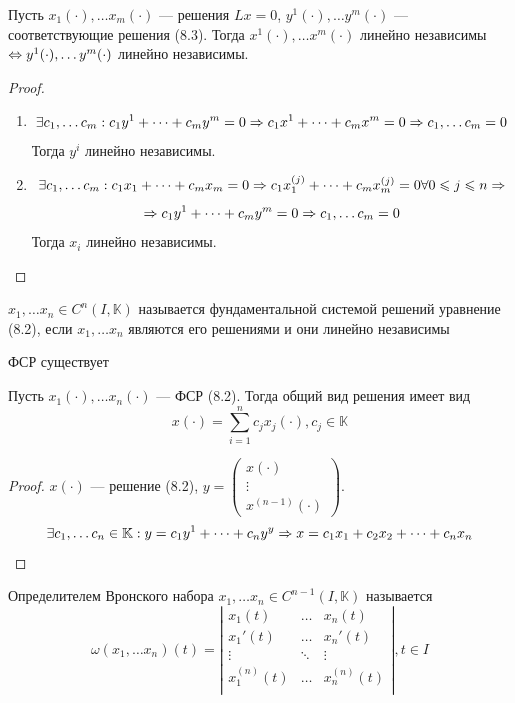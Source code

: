 \begin{lemma}
    Пусть \(x_1(\cdot), \dots x_m(\cdot)\) --- решения \(Lx = 0\), \(y^1(\cdot), \dots y^m(\cdot)\) --- соответствующие решения (8.3). Тогда \(x^1(\cdot), \dots x^m(\cdot)\) линейно независимы \(\Leftrightarrow y^1(\cdot), \dots y^m(\cdot)\) линейно независимы.
\end{lemma}
\begin{proof}\indent
    \begin{enumerate}
        \item[\(\Ra\)]
        \[\exists c_1, \dots c_m: c_1y^1 + \dots + c_my^m = 0 \Rightarrow c_1x^1 + \dots + c_mx^m = 0 \Rightarrow c_1, \dots c_m = 0\] 
        Тогда \(y^i\) линейно независимы.
        \item[\(\La\)]
        \[\exists c_1, \dots c_m: c_1x_1 + \dots + c_mx_m = 0 \Rightarrow c_1x^{(j)}_1 + \dots + c_mx^{(j)}_m = 0 \forall 0 \leqslant j \leqslant n \Rightarrow\]
        \[\Rightarrow c_1y^1 + \dots + c_my^m = 0 \Rightarrow c_1, \dots c_m = 0\]
        Тогда \(x_i\) линейно независимы.
    \end{enumerate}
\end{proof}

\begin{definition}
    \(x_1, \dots x_n \in C^n(I, \mathbb{K})\) называется фундаментальной системой решений уравнение (8.2), если \(x_1, \dots x_n\) являются его решениями и они линейно независимы
\end{definition}

\begin{corollary}[Из леммы]
    ФСР существует
\end{corollary}

\begin{theorem}
    Пусть \(x_1(\cdot), \dots x_n(\cdot)\) --- ФСР (8.2). Тогда общий вид решения имеет вид
    \[x(\cdot) = \sum_{i = 1}^n c_jx_j(\cdot), c_j \in \mathbb{K}\]
\end{theorem}
\begin{proof}
    \(x(\cdot)\) --- решение (8.2), \(y = \left( \begin{array}{c}
        x(\cdot) \\
        \vdots \\
        x^{(n - 1)}(\cdot)
    \end{array} \right)\).
    \[\exists c_1, \dots c_n \in \mathbb{K}: y = c_1y^1 + \dots + c_ny^y \Rightarrow x = c_1x_1 + c_2x_2 + \dots + c_nx_n\]
\end{proof}

\begin{definition}
    Определителем Вронского набора \(x_1, \dots x_n \in C^{n - 1}(I, \mathbb{K})\) называется
    \[\omega(x_1, \dots x_n)(t) = \left| \begin{array}{ccc}
        x_1(t) & \dots & x_n(t) \\
        x_1'(t) & \dots & x_n'(t) \\
        \vdots & \ddots & \vdots \\
        x_1^{(n)}(t) & \dots & x_n^{(n)}(t) \\
    \end{array} \right|, t \in I\]
\end{definition}


